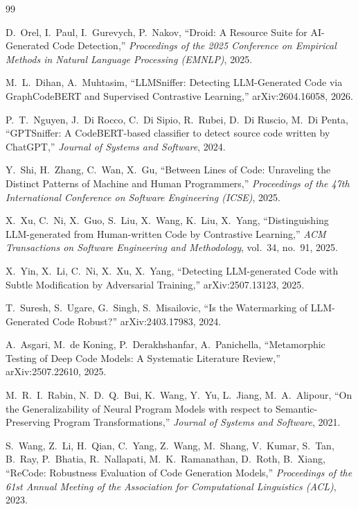 \documentclass[sigconf,review,anonymous]{acmart}
\begin{document}
\begin{thebibliography}{99}

 D.~Orel, I.~Paul, I.~Gurevych, P.~Nakov, ``Droid: A Resource Suite for AI-Generated Code Detection,'' \emph{Proceedings of the 2025 Conference on Empirical Methods in Natural Language Processing (EMNLP)}, 2025.

 M.~L.~Dihan, A.~Muhtasim, ``LLMSniffer: Detecting LLM-Generated Code via GraphCodeBERT and Supervised Contrastive Learning,'' arXiv:2604.16058, 2026.

 P.~T.~Nguyen, J.~Di Rocco, C.~Di Sipio, R.~Rubei, D.~Di Ruscio, M.~Di Penta, ``GPTSniffer: A CodeBERT-based classifier to detect source code written by ChatGPT,'' \emph{Journal of Systems and Software}, 2024.

 Y.~Shi, H.~Zhang, C.~Wan, X.~Gu, ``Between Lines of Code: Unraveling the Distinct Patterns of Machine and Human Programmers,'' \emph{Proceedings of the 47th International Conference on Software Engineering (ICSE)}, 2025.

 X.~Xu, C.~Ni, X.~Guo, S.~Liu, X.~Wang, K.~Liu, X.~Yang, ``Distinguishing LLM-generated from Human-written Code by Contrastive Learning,'' \emph{ACM Transactions on Software Engineering and Methodology}, vol.~34, no.~91, 2025.

 X.~Yin, X.~Li, C.~Ni, X.~Xu, X.~Yang, ``Detecting LLM-generated Code with Subtle Modification by Adversarial Training,'' arXiv:2507.13123, 2025.

 T.~Suresh, S.~Ugare, G.~Singh, S.~Misailovic, ``Is the Watermarking of LLM-Generated Code Robust?'' arXiv:2403.17983, 2024.

 A.~Asgari, M.~de Koning, P.~Derakhshanfar, A.~Panichella, ``Metamorphic Testing of Deep Code Models: A Systematic Literature Review,'' arXiv:2507.22610, 2025.

 M.~R.~I.~Rabin, N.~D.~Q.~Bui, K.~Wang, Y.~Yu, L.~Jiang, M.~A.~Alipour, ``On the Generalizability of Neural Program Models with respect to Semantic-Preserving Program Transformations,'' \emph{Journal of Systems and Software}, 2021.

 S.~Wang, Z.~Li, H.~Qian, C.~Yang, Z.~Wang, M.~Shang, V.~Kumar, S.~Tan, B.~Ray, P.~Bhatia, R.~Nallapati, M.~K.~Ramanathan, D.~Roth, B.~Xiang, ``ReCode: Robustness Evaluation of Code Generation Models,'' \emph{Proceedings of the 61st Annual Meeting of the Association for Computational Linguistics (ACL)}, 2023.


\end{thebibliography}
\end{document}
